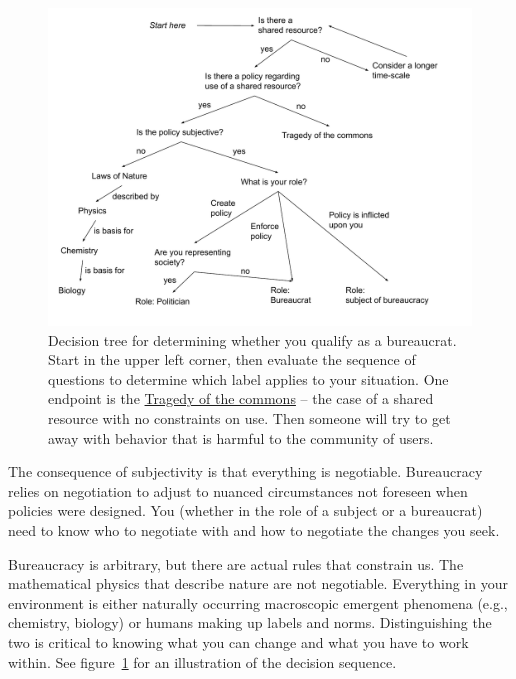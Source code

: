 \begin{figure}
    \centering
    \includegraphics[width=1.05\textwidth]{images/am_I_a_bureaucrat.pdf}
    \caption{Decision tree for determining whether you qualify as a bureaucrat. Start in the upper left corner, then evaluate the sequence of questions to determine which label applies to your situation.
    One endpoint is the \href{https://en.wikipedia.org/wiki/Tragedy_of_the_commons}{Tragedy of the commons}  
    -- the case of a shared resource with no constraints on use. Then someone will try to get away with behavior that is harmful to the community of users.}
    \label{fig:am-I-a-bureaucrat}
\end{figure}

The consequence of subjectivity is that everything is negotiable. Bureaucracy relies on negotiation to adjust to nuanced circumstances not foreseen when policies were designed.  You (whether in the role of a subject or a bureaucrat) need to know who to negotiate with and how to negotiate the changes you seek. 

Bureaucracy is arbitrary, but there are actual rules that constrain us. The mathematical physics that describe nature are not negotiable. Everything in your environment is either naturally occurring macroscopic emergent phenomena (e.g., chemistry, biology) or humans making up labels and norms. Distinguishing the two is critical to knowing what you can change and what you have to work within. See figure~\ref{fig:am-I-a-bureaucrat}\iftoggle{haspagenumbers}{ on page~\pageref{fig:am-I-a-bureaucrat}}{} for an illustration of the decision sequence.

